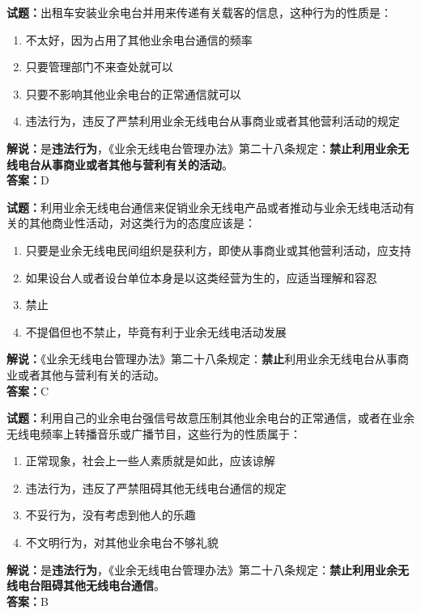 \documentclass{ctexbook}
\begin{document}
\bigskip


\noindent\textbf{试题：}出租车安装业余电台并用来传递有关载客的信息，这种行为的性质是：
\begin{enumerate}[leftmargin=3em]
	\item 不太好，因为占用了其他业余电台通信的频率
	\item 只要管理部门不来查处就可以
	\item 只要不影响其他业余电台的正常通信就可以
	\item 违法行为，违反了严禁利用业余无线电台从事商业或者其他营利活动的规定%
\end{enumerate}
\noindent\textbf{解说：}是\textbf{违法行为}，《业余无线电台管理办法》第二十八条规定：\textbf{禁止利用业余无线电台从事商业或者其他与营利有关的活动}。\\\noindent\textbf{答案：}D



\bigskip


\noindent\textbf{试题：}利用业余无线电台通信来促销业余无线电产品或者推动与业余无线电活动有关的其他商业性活动，对这类行为的态度应该是：
\begin{enumerate}[leftmargin=3em]
	\item 只要是业余无线电民间组织是获利方，即使从事商业或其他营利活动，应支持
	\item 如果设台人或者设台单位本身是以这类经营为生的，应适当理解和容忍
	\item 禁止
	\item 不提倡但也不禁止，毕竟有利于业余无线电活动发展
\end{enumerate}
\noindent\textbf{解说：}《业余无线电台管理办法》第二十八条规定：\textbf{禁止}利用业余无线电台从事商业或者其他与营利有关的活动。\\\noindent\textbf{答案：}C




\bigskip


\noindent\textbf{试题：}利用自己的业余电台强信号故意压制其他业余电台的正常通信，或者在业余无线电频率上转播音乐或广播节目，这些行为的性质属于：
\begin{enumerate}[leftmargin=3em]
	\item 正常现象，社会上一些人素质就是如此，应该谅解
	\item 违法行为，违反了严禁阻碍其他无线电台通信的规定
	\item 不妥行为，没有考虑到他人的乐趣
	\item 不文明行为，对其他业余电台不够礼貌
\end{enumerate}
\noindent\textbf{解说：}是\textbf{违法行为}，《业余无线电台管理办法》第二十八条规定：\textbf{禁止利用业余无线电台阻碍其他无线电台通信}。\\\noindent\textbf{答案：}B
\end{document}
